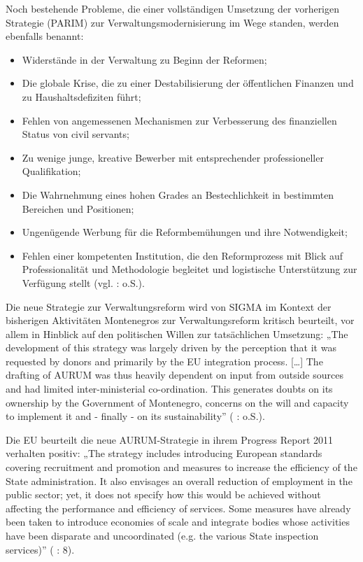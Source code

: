 Noch bestehende Probleme, die einer vollständigen Umsetzung der vorherigen Strategie (PARIM) zur Verwaltungsmodernisierung im Wege standen, werden ebenfalls benannt:
\begin{itemize} \itemsep1pt \parskip0pt 
\item Widerstände in der Verwaltung zu Beginn der Reformen;
\item Die globale Krise, die zu einer Destabilisierung der öffentlichen Finanzen und zu Haushaltsdefiziten führt;
\item Fehlen von angemessenen Mechanismen zur Verbesserung des finanziellen Status von civil servants;
\item Zu wenige junge, kreative Bewerber mit entsprechender professioneller Qualifikation;
\item Die Wahrnehmung eines hohen Grades an Bestechlichkeit in bestimmten Bereichen und Positionen;
\item Ungenügende Werbung für die Reformbemühungen und ihre Notwendigkeit;
\item Fehlen einer kompetenten Institution, die den Reformprozess mit Blick auf Professionalität und Methodologie begleitet und logistische Unterstützung zur Verfügung stellt (vgl. \cite{govmont11} : o.S.).
\end{itemize}
Die neue Strategie zur Verwaltungsreform wird von SIGMA im Kontext der bisherigen Aktivitäten Montenegros zur Verwaltungsreform kritisch beurteilt, vor allem in Hinblick auf den politischen Willen zur tatsächlichen Umsetzung: „The development of this strategy was largely driven by the perception that it was requested by donors and primarily by the EU integration process. […] The drafting of AURUM was thus heavily dependent on input from outside sources and had limited inter-ministerial co-ordination. This generates doubts on its ownership by the Government of Montenegro, concerns on the will and capacity to implement it and - finally - on its sustainability” ( \cite{oecd11a} : o.S.).
\par
Die EU beurteilt die neue AURUM-Strategie in ihrem Progress Report 2011 verhalten positiv: „The strategy includes introducing European standards covering recruitment and promotion and measures to increase the efficiency of the State administration. It also envisages an overall reduction of employment in the public sector; yet, it does not specify how this would be achieved without affecting the performance and efficiency of services. Some measures have already been taken to introduce economies of scale and integrate bodies whose activities have been disparate and uncoordinated (e.g. the various State inspection services)” (\cite{eurcom11c} : 8).\par

